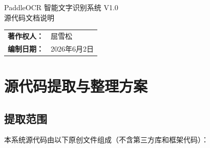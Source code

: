 \documentclass[12pt,a4paper]{ctexart}
\begin{document}
\begin{center}
{\heiti{} PaddleOCR 智能文字识别系统 V1.0}\\[0.5cm]
{ 源代码文档说明}\\[1cm]
\begin{tabular}{rl}
\textbf{著作权人：} & 屈雪松 \\
\textbf{编制日期：} & 2026年6月2日 \\
\end{tabular}
\end{center}

\vspace{1cm}

\section{源代码提取与整理方案}

\subsection{提取范围}

本系统源代码由以下原创文件组成（不含第三方库和框架代码）：
\end{document}
